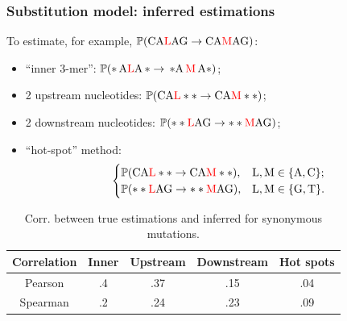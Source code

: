 \documentclass{beamer}\usepackage[]{graphicx}\usepackage[]{color}
\begin{document}
\begin{frame}
    \frametitle{Substitution model: inferred estimations}
    To estimate, for example, $\mathbb P(\mathrm{CA{\color{red} L}AG} \to \mathrm{CA{\color{red}M}AG})$:%
    \begin{itemize}
        \item ``inner 3-mer'':
            \hfill    ${\mathbb P(\mathrm{*\,A{\color{red}L}A\,*} \to \, \mathrm{*A\,{\color{red}M\,}A*})}$;
        \item 2 upstream nucleotides:
            \hfill ${\mathbb P(\mathrm{CA{\color{red}L}**} \to \mathrm{CA{\color{red}M}**})}$;
        \item 2 downstream nucleotides:
            \hfill    ${\mathbb P(\mathrm{**{\color{red}L}AG} \to \mathrm{**{\color{red}M}AG})}$;
        \item ``hot-spot'' method:
                \begin{gather*}
                    \begin{cases}
                        \mathbb P(\mathrm{CA{\color{red}L}**} \to \mathrm{CA{\color{red}M}**}), & \mathrm{L, M} \in \{\mathrm{A, C}\}; \\
                        \mathbb P(\mathrm{**{\color{red}L}AG} \to \mathrm{**{\color{red}M}AG}), & \mathrm{L, M} \in \{\mathrm{G, T}\}. 
                     \end{cases}
                \end{gather*}
    \end{itemize}
    \begin{table}[]
    \centering
    \caption{Corr. between true estimations and inferred for synonymous mutations.}
    \begin{tabular}{ccccc}
    \hline
    Correlation & Inner & Upstream & Downstream & Hot spots \\ \hline
    Pearson     & .4    & .37      & .15        & .04       \\
    Spearman    & .2    & .24      & .23        & .09      
    \end{tabular}
    \end{table}
\end{frame}
\end{document}
